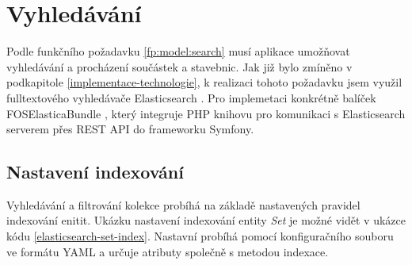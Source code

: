 \section{Vyhledávání}
Podle funkčního požadavku \ref{fp:model:search} musí aplikace umožňovat vyhledávání a procházení součástek a stavebnic. Jak již bylo zmíněno v podkapitole \ref{implementace-technologie}, k realizaci tohoto požadavku jsem využil fulltextového vyhledávače Elasticsearch \autocite{elasticsearch}. Pro implemetaci konkrétně balíček FOSElasticaBundle \autocite{foselastica}, který integruje PHP knihovu pro komunikaci s Elasticsearch serverem přes \gls{REST} API do frameworku Symfony.


\subsection{Nastavení indexování}
Vyhledávání a filtrování kolekce probíhá na základě nastavených pravidel indexování enitit. Ukázku nastavení indexování entity \textit{Set} je 
možné vidět v ukázce kódu \ref{elasticsearch-set-index}. Nastavní probíhá pomocí konfiguračního souboru ve formátu \gls{YAML} a určuje atributy společně s metodou indexace.

